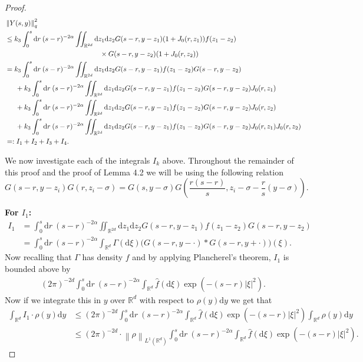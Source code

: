 \documentclass[a4paper,11pt]{article}
\numberwithin{equation}{section}
\theoremstyle{plain}
\theoremstyle{definition}
\newcommand{\R}{\mathbb{R}}
\newcommand{\Norm}[1]{\left\|  #1   \right\|}
\newcommand{\ud}{\ensuremath{\mathrm{d}}}
\begin{document}
\begin{proof}
\begin{align*}
&\Norm{Y(s,y)}_q^2\\ 
&\le k_3 \int_0^s \ud r \: (s-r)^{-2\alpha} \iint_{\R^{2d}} \ud z_1\ud z_2 G(s-r,y-z_1)  (1+J_0(r,z_1)) f(z_1-z_2)\\
&\hspace{13.5em} \times  G(s-r,y-z_2) (1+J_0(r,z_2))
\\ &=  k_3 \int_0^s \ud r \: (s-r)^{-2\alpha} \iint_{\R^{2d}} \ud z_1\ud z_2 G(s-r,y-z_1)f(z_1-z_2)G(s-r,y-z_2)
\\ &\hspace{1.5em}+  k_3 \int_0^s \ud r \: (s-r)^{-2\alpha} \iint_{\R^{2d}} \ud z_1\ud z_2 G(s-r,y-z_1)f(z_1-z_2)G(s-r,y-z_2)J_0(r,z_1)
\\ &\hspace{1.5em}+  k_3 \int_0^s \ud r \: (s-r)^{-2\alpha} \iint_{\R^{2d}} \ud z_1\ud z_2 G(s-r,y-z_1)f(z_1-z_2)G(s-r,y-z_2)J_0(r,z_2)
\\ &\hspace{1.5em}+  k_3 \int_0^s \ud r \: (s-r)^{-2\alpha} \iint_{\R^{2d}} \ud z_1\ud z_2 G(s-r,y-z_1)f(z_1-z_2)G(s-r,y-z_2)J_0(r,z_1)J_0(r,z_2)\\
   &=: I_1 +I_2+I_3+I_4.
\end{align*}

We now investigate each of the integrals $I_k$ above. Throughout the remainder of this proof and the proof of Lemma 4.2 we will be using the following relation 
\begin{equation}
	\label{E:gsim}
	G(s-r,y-z_i)G(r,z_i-\sigma)=G(s,y-\sigma)G\left(\dfrac{r(s-r)}{s},z_i-\sigma-\dfrac{r}{s}(y-\sigma)\right) .
\end{equation}

\noindent \textbf{For $I_1$:} 
\begin{align*}
	I_1 & = \int_0^s \ud r \: (s-r)^{-2\alpha} \iint_{\R^{2d}} \ud z_1\ud z_2 G(s-r,y-z_1)f(z_1-z_2)G(s-r,y-z_2)
	\\  & = \int_0^s \ud r \: (s-r)^{-2\alpha} \int_{\R^{d}} \Gamma(\ud \xi) \big(G(s-r,y-\cdot)*G(s-r,y+\cdot)\big)(\xi).
\end{align*}
Now recalling that $\Gamma$ has density $f$ and by applying Plancherel's theorem, $I_1$ is bounded above by
\begin{align*}
	(2\pi)^{-2d}\int_0^s \ud r \: (s-r)^{-2\alpha} \int_{\R^{d}} \hat f(\ud \xi) \exp\left(-(s-r)|\xi|^2 \right).
\end{align*}
Now if we integrate this in $y$ over $\R^d$ with respect to $\rho(y)\ud y$ we get that 
\begin{align*} 
	\int_{\R^d}I_1\cdot \rho(y)\ud y &\le (2\pi)^{-2d} \int_0^s \ud r \: (s-r)^{-2\alpha} \int_{\R^{d}} \hat f(\ud \xi) \exp\left(-(s-r)|\xi|^2 \right)  \int_{\R^d}\rho(y)\ud y
\\ &\le (2\pi)^{-2d}\cdot \Norm{\rho}_{L^1(\R^d)} \int_0^s \ud r \: (s-r)^{-2\alpha} \int_{\R^{d}} \hat f(\ud \xi) \exp\left(-(s-r)|\xi|^2 \right) .
\end{align*}



\end{proof}
\end{document}
